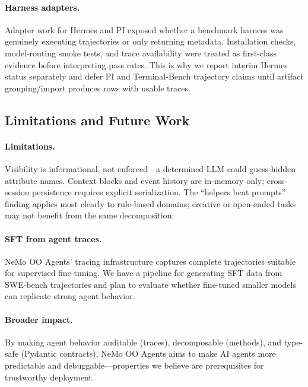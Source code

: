 \documentclass[11pt, logo, onecolumn, copyright, colorlinks=true, allcolors=blue]{nvidiatechreport}
\begin{document}
\paragraph{Harness adapters.} Adapter work for Hermes and PI exposed whether a
benchmark harness was genuinely executing trajectories or only returning
metadata. Installation checks, model-routing smoke tests, and trace availability
were treated as first-class evidence before interpreting pass rates. This is why
we report interim Hermes status separately and defer PI and Terminal-Bench
trajectory claims until artifact grouping/import produces rows with usable
traces.


\subsection{Limitations and Future Work}
\label{sec:discussion}

\paragraph{Limitations.} Visibility is informational, not enforced---a
determined LLM could guess hidden attribute names. Context blocks and event
history are in-memory only; cross-session persistence requires explicit
serialization. The ``helpers beat prompts'' finding applies most clearly to
rule-based domains; creative or open-ended tasks may not benefit from the same
decomposition.

\paragraph{SFT from agent traces.} NeMo OO Agents' tracing infrastructure captures
complete trajectories suitable for supervised fine-tuning. We have a pipeline
for generating SFT data from SWE-bench trajectories and plan to evaluate whether
fine-tuned smaller models can replicate strong agent behavior.

\paragraph{Broader impact.} By making agent behavior auditable (traces),
decomposable (methods), and type-safe (Pydantic contracts), NeMo OO Agents aims to
make AI agents more predictable and debuggable---properties we believe are
prerequisites for trustworthy deployment.
\end{document}
